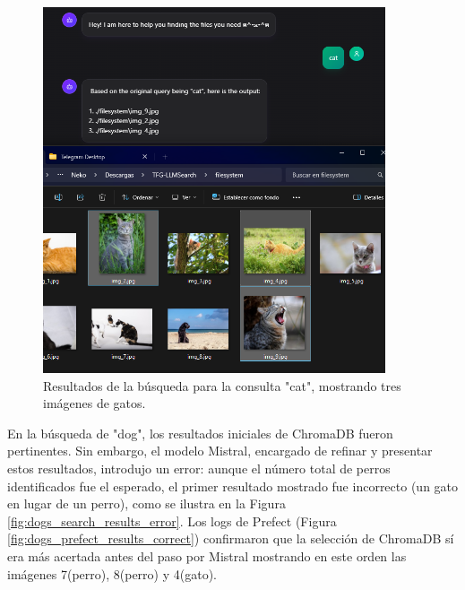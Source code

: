 \begin{figure}[H]
\centering
\includegraphics[width=0.9\textwidth]{archivos/cats_dataset_result.png}
\caption[Resultados de búsqueda para "cat"]{Resultados de la búsqueda para la consulta "cat", mostrando tres imágenes de gatos.}
\label{fig:cats_search_results}
\end{figure}

En la búsqueda de "dog", los resultados iniciales de ChromaDB fueron pertinentes. Sin embargo, el modelo Mistral, encargado de refinar y presentar estos resultados, introdujo un error: aunque el número total de perros identificados fue el esperado, el primer resultado mostrado fue incorrecto (un gato en lugar de un perro), como se ilustra en la Figura \ref{fig:dogs_search_results_error}. Los logs de Prefect (Figura \ref{fig:dogs_prefect_results_correct}) confirmaron que la selección de ChromaDB sí era más acertada antes del paso por Mistral mostrando en este orden las imágenes 7(perro), 8(perro) y 4(gato).

